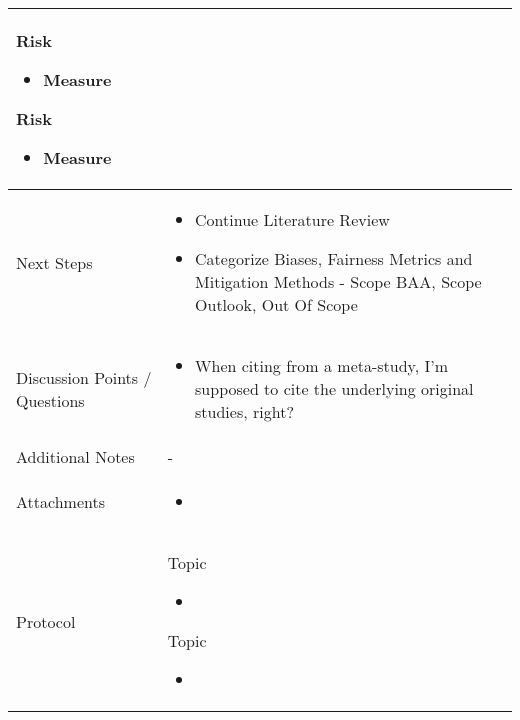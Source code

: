 \documentclass[a4paper,11pt]{article}
\begin{document}
\begin{longtable}{|p{4cm}|p{10cm}|}
	    Risk
		\begin{itemize}
			\item Measure
		\end{itemize}
		
		Risk
		\begin{itemize}
			\item Measure
		\end{itemize} \\
		
		\hline
		Next Steps & \begin{itemize}
			\item Continue Literature Review
			\item Categorize Biases, Fairness Metrics and Mitigation Methods - Scope BAA, Scope Outlook, Out Of Scope
		\end{itemize} \\
		\hline
		Discussion Points / Questions & \begin{itemize}
			\item When citing from a meta-study, I'm supposed to cite the underlying original studies, right?
		\end{itemize} \\
		\hline
		Additional Notes & - \\
		\hline
		Attachments  & \begin{itemize}
			\item 
		\end{itemize} \\
		\hline
		Protocol  & 
		Topic
		\begin{itemize}
			\item 
		\end{itemize}
		
		Topic
		\begin{itemize}
			\item 
		\end{itemize} \\
		\hline
	\end{longtable}
	
\end{document}
